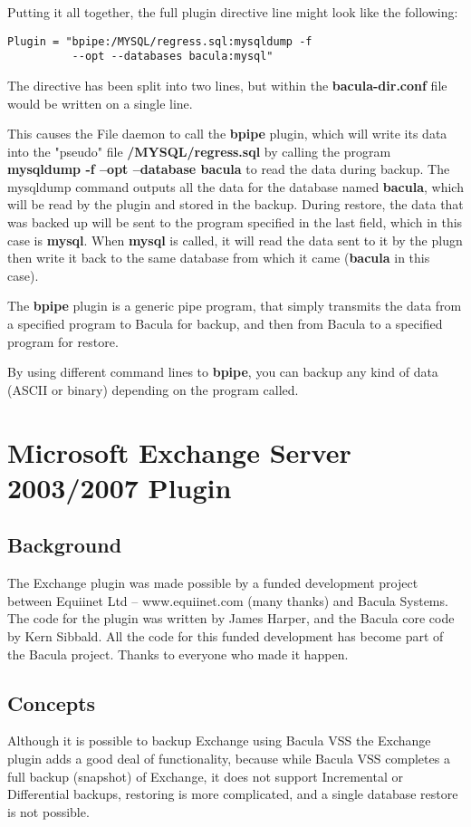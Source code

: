 Putting it all together, the full plugin directive line might look
like the following:

\begin{verbatim}
Plugin = "bpipe:/MYSQL/regress.sql:mysqldump -f 
          --opt --databases bacula:mysql"
\end{verbatim}

The directive has been split into two lines, but within the {\bf bacula-dir.conf} file
would be written on a single line.

This causes the File daemon to call the {\bf bpipe} plugin, which will write
its data into the "pseudo" file {\bf /MYSQL/regress.sql} by calling the 
program {\bf mysqldump -f --opt --database bacula} to read the data during
backup. The mysqldump command outputs all the data for the database named
{\bf bacula}, which will be read by the plugin and stored in the backup.
During restore, the data that was backed up will be sent to the program
specified in the last field, which in this case is {\bf mysql}.  When
{\bf mysql} is called, it will read the data sent to it by the plugn
then write it back to the same database from which it came ({\bf bacula}
in this case).

The {\bf bpipe} plugin is a generic pipe program, that simply transmits 
the data from a specified program to Bacula for backup, and then from Bacula to 
a specified program for restore.

By using different command lines to {\bf bpipe},
you can backup any kind of data (ASCII or binary) depending
on the program called.

\section{Microsoft Exchange Server 2003/2007 Plugin}
\subsection{Background}
The Exchange plugin was made possible by a funded development project
between Equiinet Ltd -- www.equiinet.com (many thanks) and Bacula Systems.
The code for the plugin was written by James Harper, and the Bacula core
code by Kern Sibbald.  All the code for this funded development has become
part of the Bacula project.  Thanks to everyone who made it happen.

\subsection{Concepts}
Although it is possible to backup Exchange using Bacula VSS the Exchange 
plugin adds a good deal of functionality, because while Bacula VSS
completes a full backup (snapshot) of Exchange, it does
not support Incremental or Differential backups, restoring is more
complicated, and a single database restore is not possible.

